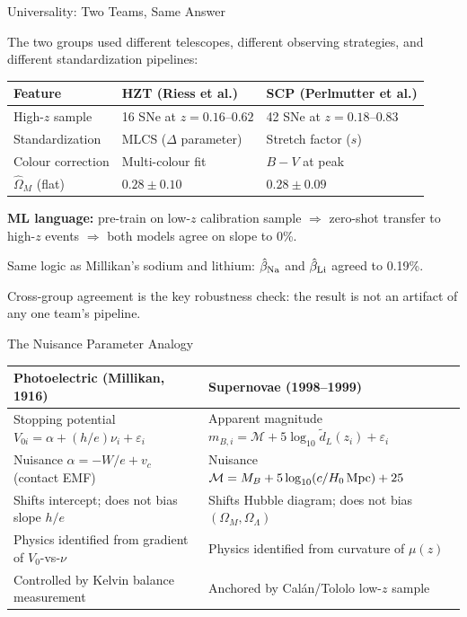 \documentclass[aspectratio=169]{beamer}
\begin{document}
\begin{frame}{Universality: Two Teams, Same Answer}

The two groups used different telescopes, different observing strategies,
and different standardization pipelines:

\medskip
\begin{center}
\small
\begin{tabular}{p{3.5cm}p{4.2cm}p{4.2cm}}
\toprule
Feature & HZT (Riess et al.) & SCP (Perlmutter et al.) \\
\midrule
High-$z$ sample & 16 SNe at $z = 0.16$--$0.62$ &
  42 SNe at $z = 0.18$--$0.83$ \\
Standardization & MLCS ($\Delta$ parameter) &
  Stretch factor ($s$) \\
Colour correction & Multi-colour fit & $B-V$ at peak \\
$\hat\Omega_M$ (flat) & $0.28 \pm 0.10$ & $0.28 \pm 0.09$ \\
\bottomrule
\end{tabular}
\end{center}

\medskip
\textbf{ML language:} pre-train on low-$z$ calibration sample $\Rightarrow$
zero-shot transfer to high-$z$ events $\Rightarrow$ both models agree
on slope to 0\%.

\medskip
Same logic as Millikan's sodium and lithium: $\hat\beta_{\rm Na}$ and
$\hat\beta_{\rm Li}$ agreed to 0.19\%.

\medskip
Cross-group agreement is the key robustness check: the result is not
an artifact of any one team's pipeline.

\end{frame}

\begin{frame}{The Nuisance Parameter Analogy}

\begin{center}
\begin{tabular}{p{5.5cm}p{6.5cm}}
\toprule
\textbf{Photoelectric (Millikan, 1916)} & \textbf{Supernovae (1998--1999)} \\
\midrule
Stopping potential $V_{0i} = \alpha + (h/e)\nu_i + \varepsilon_i$ &
  Apparent magnitude $m_{B,i} = \mathcal{M} + 5\log_{10}\tilde d_L(z_i) + \varepsilon_i$ \\[6pt]
Nuisance $\alpha = -W/e + v_c$ (contact EMF) &
  Nuisance $\mathcal{M} = M_B + 5\log_{10}(c/H_0\,{\rm Mpc}) + 25$ \\[6pt]
Shifts intercept; does not bias slope $h/e$ &
  Shifts Hubble diagram; does not bias $(\Omega_M,\Omega_\Lambda)$ \\[6pt]
Physics identified from gradient of $V_0$-vs-$\nu$ &
  Physics identified from curvature of $\mu(z)$ \\[6pt]
Controlled by Kelvin balance measurement &
  Anchored by Cal\'an/Tololo low-$z$ sample \\
\bottomrule
\end{tabular}
\end{center}

\end{frame}
\end{document}
